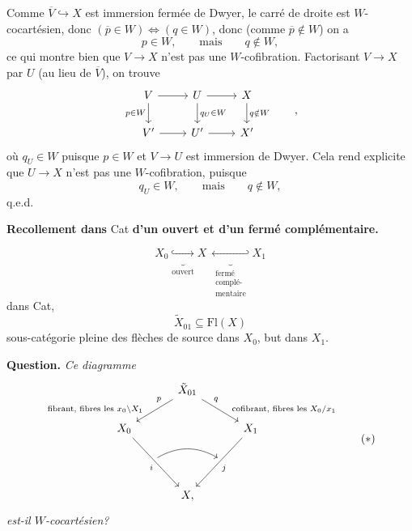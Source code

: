 \documentclass[11pt]{article}
\newcommand{\printedpage}[1]{\marginpar{\footnotesize p.~#1}}
\newcommand{\msp}[1]{\marginpar{\footnotesize [#1]}}
\begin{document}
\printedpage{12}
Comme $\overline{V} \hookrightarrow X$ est immersion fermée de Dwyer, le carré de droite est $W$-cocartésien, donc $(\overline{p} \in W) \iff (q \in W)$, donc (comme $\overline{p} \notin W$) on a
\[ p \in W, \qquad \text{mais} \qquad q \notin W, \]
ce qui montre bien que $V \longrightarrow X$ n'est pas une $W$-cofibration. Factorisant $V \longrightarrow X$ par $U$ (au lieu de $\overline{V}$), on trouve
\[
\begin{tikzcd}
V \arrow[r] \arrow[d, "p\in W"'] & U \arrow[r] \arrow[d, "q_U\in W"] & X \arrow[d, "q\notin W"] \\
V' \arrow[r] & U' \arrow[r] & X'
\end{tikzcd}
\qquad ,
\]
où $q_U \in W$ puisque $p \in W$ et $V \longrightarrow U$ est immersion de Dwyer. Cela rend explicite que $U \longrightarrow X$ n'est pas une $W$-cofibration, puisque
\[ q_U \in W, \qquad \text{mais} \qquad q \notin W, \]
\hfill q.e.d.

\msp{page 17}\textbf{Recollement dans} Cat \textbf{d'un ouvert et d'un fermé complémentaire.}


\[ X_0 \underbrace{\hookrightarrow}_{\text{ouvert}} X \ \underbrace{\hookleftarrow}_{\substack{\text{fermé}\\ \text{complé-}\\ \text{mentaire}}} X_1 \]
dans Cat,
\[ \tilde{X}_{01} \subseteq \mathrm{Fl}(X) \]
 sous-catégorie pleine des flèches de source dans $X_0$, but dans $X_1$.

\textbf{Question.} \textit{Ce diagramme}
\[
\begin{tikzcd}[column sep=small]
 & & \tilde{X}_{01} \arrow[dll, "p"' near start, "\text{fibrant, fibres les $x_0\backslash X_1$}"' near end] \arrow[drr, "q" near start, "\text{cofibrant, fibres les $X_0/x_1$}" near end] & & \\
X_0 \arrow[ddrr, "i"'] & & & & X_1 \arrow[ddll, "j"] \\
 & {} \arrow[rr, bend left] & & {} & \\
 & & X, & &
\end{tikzcd}
\tag*{$(*)$}
\]
\printedpage{13}
\textit{est-il $W$-cocartésien?}
\end{document}
